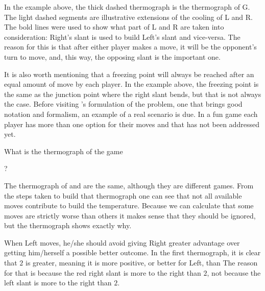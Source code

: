 

In the example above, the thick dashed thermograph is the thermograph of G. The light dashed segments are illustrative extensions of the cooling of L and R. The bold lines were used to show what part of L and R are taken into consideration: Right's slant is used to build Left's slant and vice-versa. The reason for this is that after either player makes a move, it will be the opponent's turn to move, and, this way, the opposing slant is the important one.

It is also worth mentioning that a freezing point will always be reached after an equal amount of move by each player. In the example above, the freezing point is the same as the junction point where the right slant bends, but that is not always the case. Before visiting 's formulation of the problem, one that brings good notation and formalism, an example of a real scenario is due. In a fun game each player has more than one option for their moves and that has not been addressed yet.

What is the thermograph of the game \Gm{=}
	 ? 







The thermograph of \Gm{} and  are the same, although they are different games. From the steps taken to build that thermograph one can see that not all available moves contribute to build the temperature. Because we can calculate that some moves are strictly worse than others it makes sense that they should be ignored, but the thermograph shows exactly why.

When Left moves, he/she should avoid giving Right greater advantage over getting him/herself a possible better outcome. In the first thermograph, it is clear that $2$ is greater, meaning it is more positive, or better for Left, than  The reason for that is because the red right slant is more to the right than $2$, not because the left slant is more to the right than $2$.

